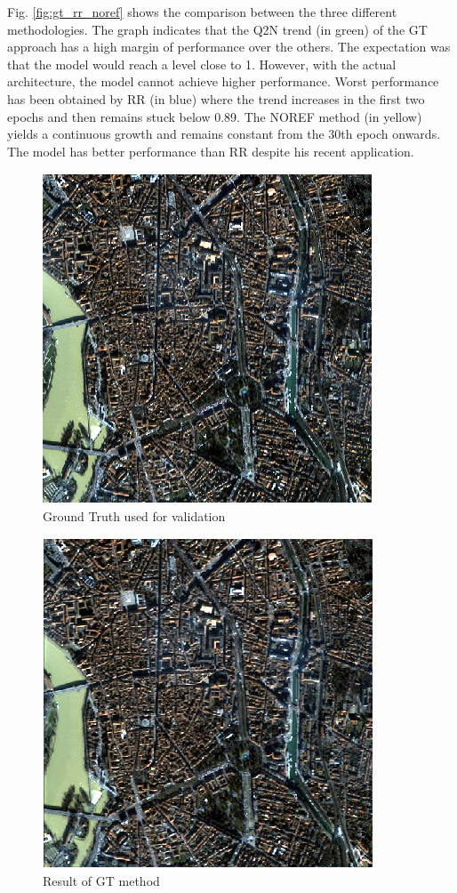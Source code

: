 \documentclass[12pt]{report}
\begin{document}
Fig. \ref{fig:gt_rr_noref} shows the comparison between the three different methodologies. 
The graph indicates that the Q2N trend (in green) of the GT approach has a high margin of performance over the others. The expectation was that the model would reach a level close to 1. However, with the actual architecture, the model cannot achieve higher performance.
Worst performance has been obtained by RR (in blue) where the trend increases in the first two epochs and then remains stuck below 0.89. 
The NOREF method (in yellow) yields a continuous growth and remains constant from the 30th epoch onwards. 
The model has better performance than RR despite his recent application.



\begin{figure}
    \centering
    \includegraphics[scale=.8]{Target.png}
    \caption{Ground Truth used for validation}
    \label{fig:comparison_target}
\end{figure}

\begin{figure}
    \centering
    \includegraphics[scale=.8]{GT.png}
    \caption{Result of GT method}
    \label{fig:comparison_gt}
\end{figure}
\end{document}
